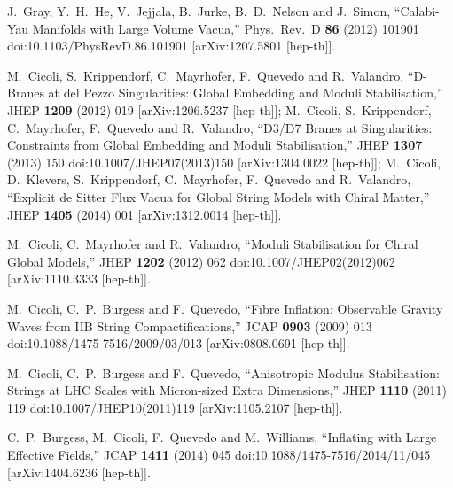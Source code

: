 \documentclass[11pt,a4paper]{article}
\begin{document}
\begin{thebibliography}{99}
  J.~Gray, Y.~H.~He, V.~Jejjala, B.~Jurke, B.~D.~Nelson and J.~Simon,
  ``Calabi-Yau Manifolds with Large Volume Vacua,''
  Phys.\ Rev.\ D {\bf 86} (2012) 101901
  doi:10.1103/PhysRevD.86.101901
  [arXiv:1207.5801 [hep-th]].

M.~Cicoli, S.~Krippendorf, C.~Mayrhofer, F.~Quevedo and R.~Valandro,
  ``D-Branes at del Pezzo Singularities: Global Embedding and Moduli Stabilisation,''
  JHEP {\bf 1209} (2012) 019
  [arXiv:1206.5237 [hep-th]];
	M.~Cicoli, S.~Krippendorf, C.~Mayrhofer, F.~Quevedo and R.~Valandro,
  ``D3/D7 Branes at Singularities: Constraints from Global Embedding and Moduli Stabilisation,''
  JHEP {\bf 1307} (2013) 150
  doi:10.1007/JHEP07(2013)150
  [arXiv:1304.0022 [hep-th]];
M.~Cicoli, D.~Klevers, S.~Krippendorf, C.~Mayrhofer, F.~Quevedo and R.~Valandro,
  ``Explicit de Sitter Flux Vacua for Global String Models with Chiral Matter,''
  JHEP {\bf 1405} (2014) 001
  [arXiv:1312.0014 [hep-th]].
	
  M.~Cicoli, C.~Mayrhofer and R.~Valandro,
  ``Moduli Stabilisation for Chiral Global Models,''
  JHEP {\bf 1202} (2012) 062
  doi:10.1007/JHEP02(2012)062
  [arXiv:1110.3333 [hep-th]].
	
  M.~Cicoli, C.~P.~Burgess and F.~Quevedo,
  ``Fibre Inflation: Observable Gravity Waves from IIB String Compactifications,''
  JCAP {\bf 0903} (2009) 013
  doi:10.1088/1475-7516/2009/03/013
  [arXiv:0808.0691 [hep-th]].

  M.~Cicoli, C.~P.~Burgess and F.~Quevedo,
  ``Anisotropic Modulus Stabilisation: Strings at LHC Scales with Micron-sized Extra Dimensions,''
  JHEP {\bf 1110} (2011) 119
  doi:10.1007/JHEP10(2011)119
  [arXiv:1105.2107 [hep-th]].
	
  C.~P.~Burgess, M.~Cicoli, F.~Quevedo and M.~Williams,
  ``Inflating with Large Effective Fields,''
  JCAP {\bf 1411} (2014) 045
  doi:10.1088/1475-7516/2014/11/045
  [arXiv:1404.6236 [hep-th]].


\end{thebibliography}
\end{document}
